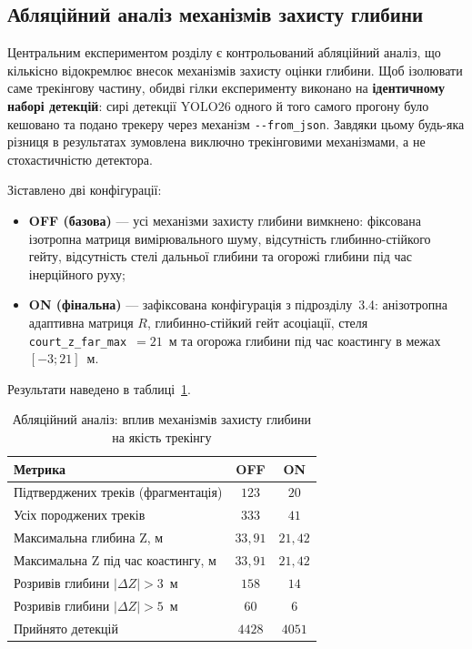 \subsection{Абляційний аналіз механізмів захисту глибини}

Центральним експериментом розділу є контрольований абляційний аналіз, що кількісно
відокремлює внесок механізмів захисту оцінки глибини. Щоб ізолювати саме трекінгову
частину, обидві гілки експерименту виконано на \textbf{ідентичному наборі детекцій}:
сирі детекції \gls{YOLO}26 одного й того самого прогону було кешовано та подано трекеру
через механізм \texttt{-{}-from\_json}. Завдяки цьому будь-яка різниця в результатах
зумовлена виключно трекінговими механізмами, а не стохастичністю детектора.

Зіставлено дві конфігурації:
\begin{itemize}
    \item \textbf{OFF (базова)} --- усі механізми захисту глибини вимкнено: фіксована
    ізотропна матриця вимірювального шуму, відсутність глибинно-стійкого гейту,
    відсутність стелі дальньої глибини та огорожі глибини під час інерційного руху;
    \item \textbf{ON (фінальна)} --- зафіксована конфігурація з підрозділу~3.4:
    анізотропна адаптивна матриця $R$, глибинно-стійкий гейт асоціації,
    стеля \texttt{court\_z\_far\_max}~$=21$~м та огорожа глибини під час коастингу
    в межах $[-3; 21]$~м.
\end{itemize}

Результати наведено в таблиці~\ref{tab:ablation}.

\begin{table}[H]
\centering
\caption{Абляційний аналіз: вплив механізмів захисту глибини на якість трекінгу}
\label{tab:ablation}
\begin{tabular}{|l|c|c|}
\hline
\textbf{Метрика} & \textbf{OFF} & \textbf{ON} \\
\hline
Підтверджених треків (фрагментація) & $123$ & $20$ \\
Усіх породжених треків & $333$ & $41$ \\
Максимальна глибина Z, м & $33{,}91$ & $21{,}42$ \\
Максимальна Z під час коастингу, м & $33{,}91$ & $21{,}42$ \\
Розривів глибини $|\Delta Z| > 3$~м & $158$ & $14$ \\
Розривів глибини $|\Delta Z| > 5$~м & $60$ & $6$ \\
Прийнято детекцій & $4428$ & $4051$ \\
\hline
\end{tabular}
\end{table}

